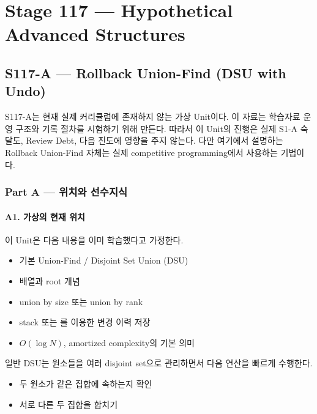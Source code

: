 \part{Stage 117 --- Hypothetical Advanced Structures}
\chapter{S117-A --- Rollback Union-Find (DSU with Undo)}

\begin{notebox}
S117-A는 현재 실제 커리큘럼에 존재하지 않는 가상 Unit이다. 이 자료는 학습자료 운영 구조와 기록 절차를 시험하기 위해 만든다. 따라서 이 Unit의 진행은 실제 S1-A 숙달도, Review Debt, 다음 진도에 영향을 주지 않는다. 다만 여기에서 설명하는 Rollback Union-Find 자체는 실제 competitive programming에서 사용하는 기법이다.
\end{notebox}

\section{Part A --- 위치와 선수지식}

\subsection{A1. 가상의 현재 위치}
이 Unit은 다음 내용을 이미 학습했다고 가정한다.
\begin{itemize}
\item 기본 Union-Find / Disjoint Set Union (DSU)
\item {} 배열과 root 개념
\item union by size 또는 union by rank
\item stack 또는 를 이용한 변경 이력 저장
\item $O(\log N)$, amortized complexity의 기본 의미
\end{itemize}

일반 DSU는 원소들을 여러 disjoint set으로 관리하면서 다음 연산을 빠르게 수행한다.
\begin{itemize}
\item 두 원소가 같은 집합에 속하는지 확인
\item 서로 다른 두 집합을 합치기
\end{itemize}

